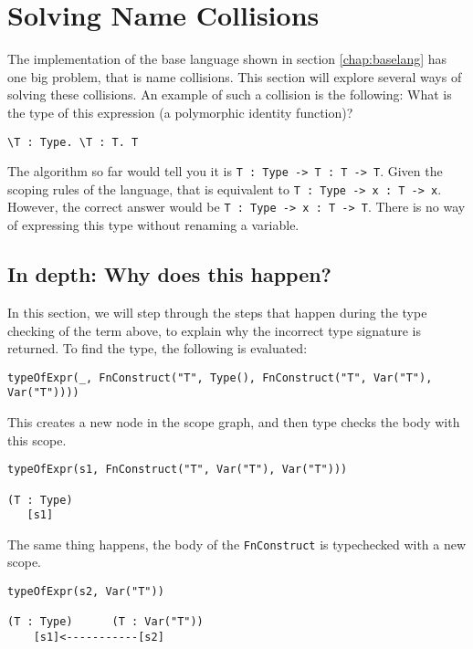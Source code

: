
\chapter{\label{chap:namecolls}Solving Name Collisions}

The implementation of the base language shown in section \ref{chap:baselang} has one big problem, that is name collisions. This section will explore several ways of solving these collisions. An example of such a collision is the following: What is the type of this expression (a polymorphic identity function)?
\begin{lstlisting}
\T : Type. \T : T. T
\end{lstlisting}

The algorithm so far would tell you it is \verb|T : Type -> T : T -> T|. Given the scoping rules of the language, that is equivalent to \verb|T : Type -> x : T -> x|. However, the correct answer would be \verb|T : Type -> x : T -> T|. There is no way of expressing this type without renaming a variable.

\section{In depth: Why does this happen?}

In this section, we will step through the steps that happen during the type checking of the term above, to explain why the incorrect type signature is returned. To find the type, the following is evaluated:

\begin{lstlisting}
typeOfExpr(_, FnConstruct("T", Type(), FnConstruct("T", Var("T"), Var("T"))))
\end{lstlisting}

\noindent
This creates a new node in the scope graph, and then type checks the body with this scope.

\begin{lstlisting}
typeOfExpr(s1, FnConstruct("T", Var("T"), Var("T")))

(T : Type)
   [s1]
\end{lstlisting}

\noindent
The same thing happens, the body of the \verb|FnConstruct| is typechecked with a new scope.

\begin{lstlisting}
typeOfExpr(s2, Var("T"))
	
(T : Type)      (T : Var("T"))
	[s1]<-----------[s2]
\end{lstlisting}

